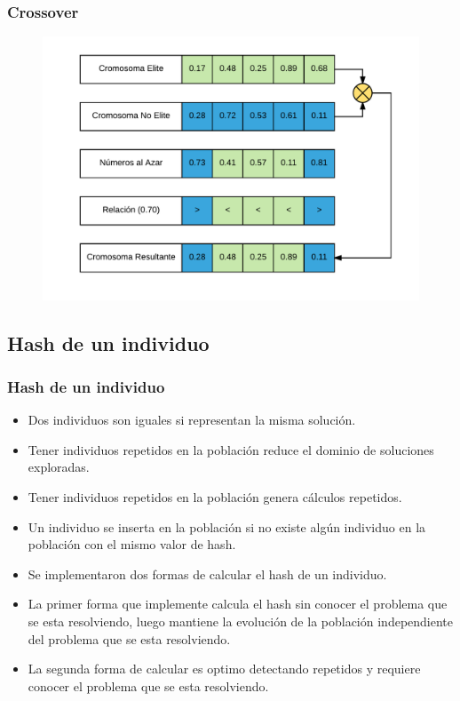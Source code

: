 \documentclass{beamer}
\begin{document}

\begin{frame}
\frametitle{Crossover}

\begin{figure}[h]
	\centering
	\includegraphics[width=12cm]{BiasCrossover}
	\label{fig:BiasCrossover}
\end{figure}

\end{frame}


\subsection{Hash de un individuo}

\begin{frame}
\frametitle{Hash de un individuo}

\begin{itemize}
    \item Dos individuos son iguales si representan la misma solución.
    \pause
    \item Tener individuos repetidos en la población reduce el dominio de soluciones exploradas.
    \pause
    \item Tener individuos repetidos en la población genera cálculos repetidos.
    \pause
    \item Un individuo se inserta en la población si no existe algún individuo en la población con el mismo valor de hash.
    \pause
    \item Se implementaron dos formas de calcular el hash de un individuo.
    \pause
    \item La primer forma que implemente calcula el hash sin conocer el problema que se esta resolviendo, luego mantiene la evolución de la población independiente del problema que se esta resolviendo.
    \pause
    \item La segunda forma de calcular es optimo detectando repetidos y requiere conocer el problema que se esta resolviendo.
\end{itemize}

\end{frame}
\end{document}
